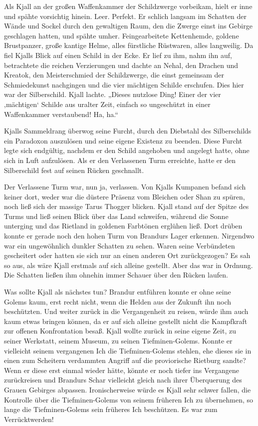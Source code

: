 \documentclass[10pt, a4paper, oneside]{book}
\begin{document}
Als Kjall an der großen Waffenkammer der Schildzwerge vorbeikam, hielt er inne und spähte vorsichtig hinein. Leer. Perfekt. Er schlich langsam im Schatten der Wände und Sockel durch den gewaltigen Raum, den die Zwerge einst ins Gebirge geschlagen hatten, und spähte umher. Feingearbeitete Kettenhemde, goldene Brustpanzer, große kantige Helme, alles fürstliche Rüstwaren, alles langweilig. Da fiel Kjalls Blick auf einen Schild in der Ecke. Er lief zu ihm, nahm ihn auf, betrachtete die reichen Verzierungen und dachte an Nehal, den Drachen und Kreatok, den Meisterschmied der Schildzwerge, die einst gemeinsam der Schmiedekunst nachgingen und die vier mächtigen Schilde erschufen. Dies hier war der Silberschild. Kjall lachte. „Dieses nutzlose Ding! Einer der vier ‚mächtigen‘ Schilde aus uralter Zeit, einfach so ungeschützt in einer Waffenkammer verstaubend! Ha, ha.“

Kjalls Sammeldrang überwog seine Furcht, durch den Diebstahl des Silberschilds ein Paradoxon auszulösen und seine eigene Existenz zu beenden. Diese Furcht legte sich endgültig, nachdem er den Schild angehoben und angelegt hatte, ohne sich in Luft aufzulösen. Als er den Verlassenen Turm erreichte, hatte er den Silberschild fest auf seinen Rücken geschnallt.\bigskip



Der Verlassene Turm war, nun ja, verlassen. Von Kjalls Kumpanen befand sich keiner dort, weder war die düstere Präsenz vom Bleichen oder Shan zu spüren, noch ließ sich der massige Tarus Thogger blicken. Kjall stand auf der Spitze des Turms und ließ seinen Blick über das Land schweifen, während die Sonne unterging und das Rietland in goldenen Farbtönen erglühen ließ. Dort drüben konnte er gerade noch den hohen Turm von Brandurs Lager erkennen. Nirgendwo war ein ungewöhnlich dunkler Schatten zu sehen. Waren seine Verbündeten gescheitert oder hatten sie sich nur an einen anderen Ort zurückgezogen? Es sah so aus, als wäre Kjall erstmals auf sich alleine gestellt. Aber das war in Ordnung. Die Schatten ließen ihm ohnehin immer Schauer über den Rücken laufen.

Was sollte Kjall als nächstes tun? Brandur entführen konnte er ohne seine Golems kaum, erst recht nicht, wenn die Helden aus der Zukunft ihn noch beschützten. Und weiter zurück in die Vergangenheit zu reisen, würde ihm auch kaum etwas bringen können, da er auf sich alleine gestellt nicht die Kampfkraft zur offenen Konfrontation besaß. Kjall wollte zurück in seine eigene Zeit, zu seiner Werkstatt, seinem Museum, zu seinen Tiefminen-Golems. Konnte er vielleicht seinem vergangenen Ich die Tiefminen-Golems stehlen, ehe dieses sie in einen zum Scheitern verdammten Angriff auf die proviorische Rietburg sandte? Wenn er diese erst einmal wieder hätte, könnte er noch tiefer ins Vergangene zurückreisen und Brandurs Schar vielleicht gleich nach ihrer Überquerung des Grauen Gebirges abpassen. Ironischerweise würde es Kjall sehr schwer fallen, die Kontrolle über die Tiefminen-Golems von seinem früheren Ich zu übernehmen, so lange die Tiefminen-Golems sein früheres Ich beschützen. Es war zum Verrücktwerden!
\end{document}
